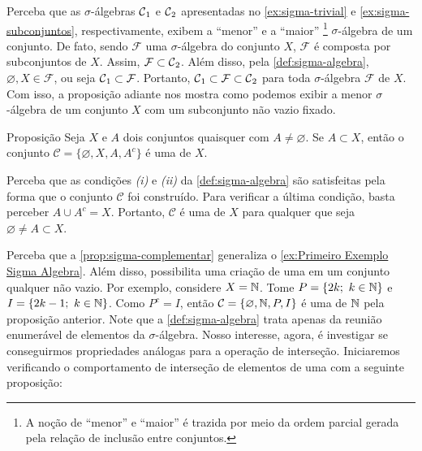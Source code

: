 Perceba que as $\sigma$-álgebras $\operatorname{\mathcal{C}}_1$ e $\operatorname{\mathcal{C}}_2$ apresentadas no \ref{ex:sigma-trivial} e \ref{ex:sigma-subconjuntos}, respectivamente, exibem a \enquote{menor} e a \enquote{maior}
\footnote{
	A noção de \enquote{menor} e \enquote{maior} é trazida por meio da ordem parcial gerada pela relação de inclusão entre conjuntos.
	} 
$\sigma$-álgebra de um conjunto.
De fato, sendo $\mathcal{F}$ uma $\sigma$-álgebra do conjunto $X$, $\mathcal{F}$ é composta por subconjuntos de $X$.
Assim, $\mathcal{F} \subset \operatorname{\mathcal{C}}_2$.
Além disso, pela \ref{def:sigma-algebra}, $\varnothing, X \in \mathcal{F}$, ou seja $\operatorname{\mathcal{C}}_1 \subset \mathcal{F}$.
Portanto, $\operatorname{\mathcal{C}}_1 \subset \mathcal{F} \subset \operatorname{\mathcal{C}}_2$ para toda $\sigma$-álgebra $\mathcal{F}$ de $X$.
Com isso, a proposição adiante nos mostra como podemos exibir a menor $\sigma$-álgebra de um conjunto $X$ com um subconjunto não vazio fixado.
\begin{env}{Proposição}
\label{prop:sigma-complementar}
    Seja $X$ e $A$ dois conjuntos quaisquer com $A \neq \varnothing$.
    Se $A \subset X$, então o conjunto 
    $\mathcal{C}=\{\varnothing, X, A, A^c\}$ é uma \sigal de $X$.
\end{env}

\begin{prova}
    Perceba que as condições \textit{(i)} e \textit{(ii)} da  \ref{def:sigma-algebra} são satisfeitas pela forma que o conjunto  $\mathcal{C}$ foi construído. Para verificar a última condição, basta perceber $A \cup A^c = X$. Portanto, $\mathcal{C}$ é uma \sigal de $X$ para qualquer que seja $ \varnothing \neq A \subset X$.
\end{prova}

Perceba que a \ref{prop:sigma-complementar} generaliza o \ref{ex:Primeiro Exemplo Sigma Algebra}. Além disso, possibilita uma criação de uma \sigal em um conjunto qualquer não vazio.
Por exemplo, considere $X = \operatorname{\mathbb{N}}$.
Tome $P =\{2k; \ k \in \operatorname{\mathbb{N}}\}$ e $I = \{2k - 1;\ k \in \N\}$.
Como $P^c = I$, então $\mathcal{C} = \{\varnothing, \operatorname{\mathbb{N}}, P, I\}$ é uma \sigal de $\operatorname{\mathbb{N}}$ pela proposição anterior.
Note que a  \ref{def:sigma-algebra} trata apenas da reunião enumerável de elementos da $\sigma$-álgebra. 
Nosso interesse, agora, é investigar se conseguirmos propriedades análogas para a operação de interseção. 
Iniciaremos verificando o comportamento de interseção de elementos de uma \sigal com a seguinte proposição:

